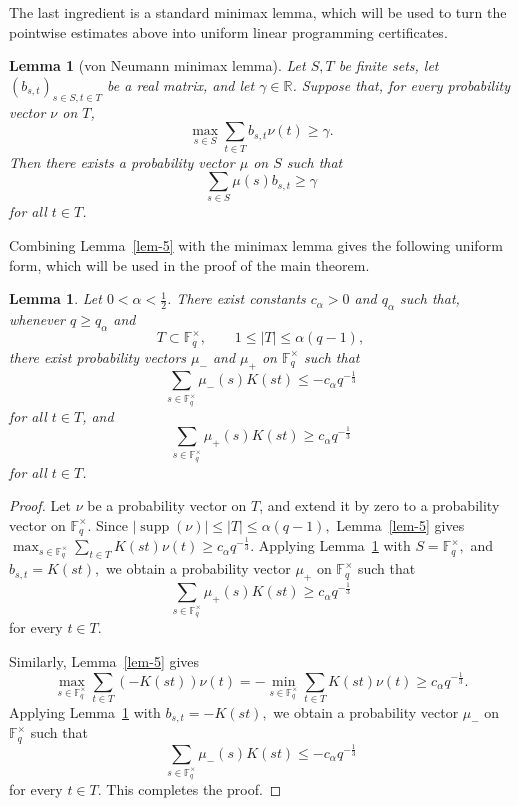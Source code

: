 \documentclass[11pt]{article}
\newtheorem{lemma}[theorem]{Lemma}
\newcommand{\1}{\mathbf{1}}
\begin{document}
The last ingredient is a standard minimax lemma, which will be used to turn the pointwise estimates above into uniform linear programming certificates.

\begin{lemma}[von Neumann minimax lemma]\cite{V1928}\label{lem-6}
	Let \(S,T\) be finite sets, let \((b_{s,t})_{s\in S,t\in T}\) be a real matrix, and let \(\gamma\in\mathbb{R}\). Suppose that, for every probability vector \(\nu\) on \(T\),
	\[
	\max_{s\in S}\sum_{t\in T}b_{s,t}\nu(t)\ge \gamma.
	\]
	Then there exists a probability vector \(\mu\) on \(S\) such that
	\[
	\sum_{s\in S}\mu(s)b_{s,t}\ge \gamma
	\]
	for all \(t\in T\).
\end{lemma}

Combining Lemma~\ref{lem-5} with the minimax lemma gives the following uniform form, which will be used in the proof of the main theorem.

\begin{lemma}\label{lem-7}
	Let \(0<\alpha<\frac12\). There exist constants \(c_\alpha>0\) and \(q_\alpha\) such that, whenever \(q\ge q_\alpha\) and
	\[
	T\subset\mathbb{F}_q^\times,
	\qquad
	1\le |T|\le \alpha(q-1),
	\]
	there exist probability vectors \(\mu_-\) and \(\mu_+\) on \(\mathbb{F}_q^\times\) such that
	\[
	\sum_{s\in\mathbb{F}_q^\times}\mu_-(s)K(st)
	\le
	-c_\alpha q^{-\frac{1}{3}}
	\]
	for all \(t\in T\), and
	\[
	\sum_{s\in\mathbb{F}_q^\times}\mu_+(s)K(st)
	\ge
	c_\alpha q^{-\frac{1}{3}}
	\]
	for all \(t\in T\).
\end{lemma}

\begin{proof}
	Let \(\nu\) be a probability vector on \(T\), and extend it by zero to a probability vector on \(\mathbb{F}_q^\times\). Since $|\operatorname{supp}(\nu)|\le |T|\le \alpha(q-1),$
	Lemma~\ref{lem-5} gives $	\max_{s\in\mathbb{F}_q^\times}
	\sum_{t\in T}K(st)\nu(t)
	\ge
	c_\alpha q^{-\frac{1}{3}}.$
	Applying Lemma~\ref{lem-6} with $S=\mathbb{F}_q^\times,$ and $b_{s,t}=K(st),$
	we obtain a probability vector \(\mu_+\) on \(\mathbb{F}_q^\times\) such that
	\[
	\sum_{s\in\mathbb{F}_q^\times}\mu_+(s)K(st)
	\ge
	c_\alpha q^{-\frac{1}{3}}
	\]
	for every \(t\in T\).
	
	Similarly, Lemma~\ref{lem-5} gives
	\[
	\max_{s\in\mathbb{F}_q^\times}
	\sum_{t\in T}(-K(st))\nu(t)
	=
	-\min_{s\in\mathbb{F}_q^\times}
	\sum_{t\in T}K(st)\nu(t)
	\ge
	c_\alpha q^{-\frac{1}{3}}.
	\]
	Applying Lemma~\ref{lem-6} with $b_{s,t}=-K(st),$
	we obtain a probability vector \(\mu_-\) on \(\mathbb{F}_q^\times\) such that
	\[
	\sum_{s\in\mathbb{F}_q^\times}\mu_-(s)K(st)
	\le
	-c_\alpha q^{-\frac{1}{3}}
	\]
	for every \(t\in T\). This completes the proof.
\end{proof}
\end{document}
